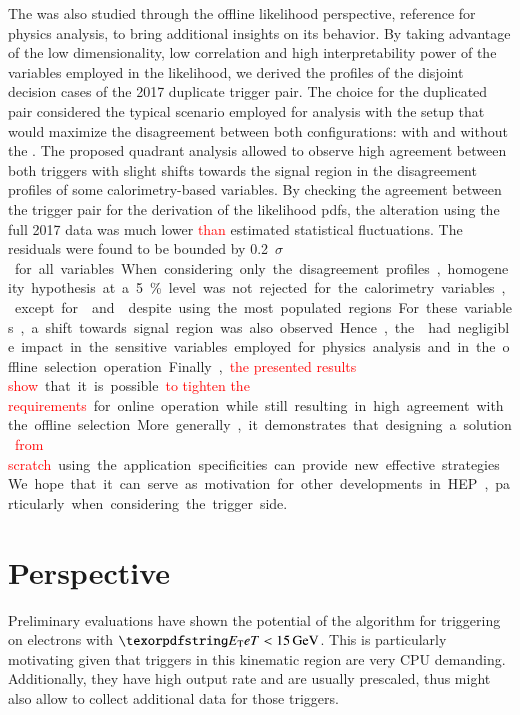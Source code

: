 The \rnn{} was also studied through the offline likelihood perspective,
reference for physics analysis, to bring additional insights on its behavior. By
taking advantage of the low dimensionality, low correlation and high
interpretability power of the variables employed in the likelihood, we derived
the profiles of the disjoint decision cases of the 2017 duplicate trigger pair.
The choice for the duplicated pair considered the typical scenario employed for
analysis with the setup that would maximize the disagreement between both
configurations: with and without the \rnn{}. The proposed quadrant analysis
allowed to observe high agreement between both triggers with slight shifts
towards the signal region in the disagreement profiles of some calorimetry-based
variables. By checking the agreement between the trigger pair for the derivation
of the likelihood pdfs, the alteration using the full 2017 data was much lower
\textcolor{red}{than} estimated statistical fluctuations. The residuals were found to be bounded
by \SI{0.2}{$\sigma$} for all variables. When considering only the
disagreement profiles, homogeneity hypothesis at a \SI{5}{\%} level was not
rejected for the calorimetry variables, except for \reta{} and \rhad{} despite
using the most populated regions. For these variables, a shift towards signal
region was also observed. Hence, the \rnn{} had negligible impact in the
sensitive variables employed for physics analysis and in the offline selection
operation.

Finally, \textcolor{red}{the presented results show} that it is possible \textcolor{red}{to tighten the requirements} for online operation while still resulting in high agreement with the offline
selection. More generally, it demonstrates that designing a solution \textcolor{red}{from scratch} using the application specificities can provide new effective
strategies. We hope that it can serve as motivation for other developments in
HEP, particularly when considering the trigger side.

\section{Perspective}







Preliminary evaluations have shown the potential of the \rnn{} algorithm for
triggering on electrons with $\et<\SI{15}{\GeV}$. This is particularly motivating given that triggers in this kinematic region are very
CPU demanding. Additionally, they have high output rate and are usually
prescaled, thus \rnn{} might also allow to collect additional data for those
triggers.


